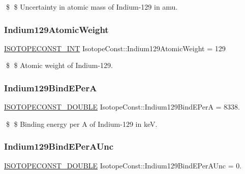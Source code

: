\$ \$ Uncertainty in atomic mass of Indium-\/129 in amu. \mbox{\label{group___isotope_const-_indium-_in129_ga9783db0affa75460433a8f1a1b0705be}} 
\subsubsection{\texorpdfstring{Indium129\+Atomic\+Weight}{Indium129AtomicWeight}}
{\footnotesize\ttfamily \mbox{\hyperlink{group___isotope_const-_macros_ga5f18360b3e99483a35c32d789e62621c}{I\+S\+O\+T\+O\+P\+E\+C\+O\+N\+S\+T\+\_\+\+I\+NT}} Isotope\+Const\+::\+Indium129\+Atomic\+Weight = 129}

\$ \$ Atomic weight of Indium-\/129. \mbox{\label{group___isotope_const-_indium-_in129_ga070ba1940e3bc4f12dda96caacda0dbd}} 
\subsubsection{\texorpdfstring{Indium129\+Bind\+E\+PerA}{Indium129BindEPerA}}
{\footnotesize\ttfamily \mbox{\hyperlink{group___isotope_const-_macros_ga8f45a7272ce02c0b4c65c44636ed719a}{I\+S\+O\+T\+O\+P\+E\+C\+O\+N\+S\+T\+\_\+\+D\+O\+U\+B\+LE}} Isotope\+Const\+::\+Indium129\+Bind\+E\+PerA = 8338.}

\$ \$ Binding energy per A of Indium-\/129 in keV. \mbox{\label{group___isotope_const-_indium-_in129_ga06c743ead7ac55ab7ec5acd53006394c}} 
\subsubsection{\texorpdfstring{Indium129\+Bind\+E\+Per\+A\+Unc}{Indium129BindEPerAUnc}}
{\footnotesize\ttfamily \mbox{\hyperlink{group___isotope_const-_macros_ga8f45a7272ce02c0b4c65c44636ed719a}{I\+S\+O\+T\+O\+P\+E\+C\+O\+N\+S\+T\+\_\+\+D\+O\+U\+B\+LE}} Isotope\+Const\+::\+Indium129\+Bind\+E\+Per\+A\+Unc = 0.}

